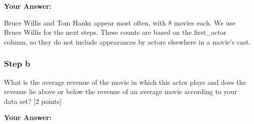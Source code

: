 \documentclass[
]{article}
\newenvironment{Shaded}{\begin{snugshade}}{\end{snugshade}}
\newcommand{\AttributeTok}[1]{\textcolor[rgb]{0.13,0.29,0.53}{#1}}
\newcommand{\CommentTok}[1]{\textcolor[rgb]{0.56,0.35,0.01}{\textit{#1}}}
\newcommand{\ConstantTok}[1]{\textcolor[rgb]{0.56,0.35,0.01}{#1}}
\newcommand{\DocumentationTok}[1]{\textcolor[rgb]{0.56,0.35,0.01}{\textbf{\textit{#1}}}}
\newcommand{\FunctionTok}[1]{\textcolor[rgb]{0.13,0.29,0.53}{\textbf{#1}}}
\newcommand{\NormalTok}[1]{#1}
\newcommand{\OtherTok}[1]{\textcolor[rgb]{0.56,0.35,0.01}{#1}}
\newcommand{\SpecialCharTok}[1]{\textcolor[rgb]{0.81,0.36,0.00}{\textbf{#1}}}
\newcommand{\StringTok}[1]{\textcolor[rgb]{0.31,0.60,0.02}{#1}}
\begin{document}
\begin{Shaded}
\end{Shaded}

\textbf{Your Answer:}

Bruce Willis and Tom Hanks appear most often, with 8 movies each. We use
Bruce Willis for the next steps. These counts are based on the
first\_actor column, so they do not include appearances by actors
elsewhere in a movie's cast.

\subsubsection{Step b}\label{step-b-1}

What is the average revenue of the movie in which this actor plays and
does the revenue lie above or below the revenue of an average movie
according to your data set? {[}2 points{]}

\begin{Shaded}
\end{Shaded}

\textbf{Your Answer:}
\end{document}
